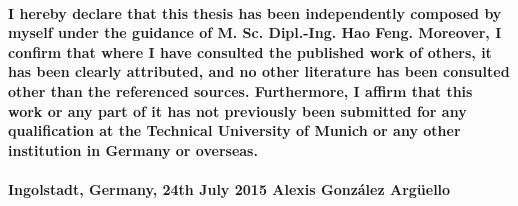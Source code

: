 \bigskip\bigskip\bigskip
\linespread{1.5}
\paragraph{I hereby declare that this thesis has been independently composed by myself under the guidance of M. Sc. Dipl.-Ing. Hao Feng. Moreover, I confirm that where I have consulted the published work of others, it has been clearly attributed, and no other literature has been consulted other than the referenced sources. Furthermore, I affirm that this work or any part of it has not previously been submitted for any qualification at the Technical University of Munich or any other institution in Germany or overseas. }
\bigskip\bigskip\bigskip
\paragraph{ \hspace{1.5cm} Ingolstadt, Germany, 24th July 2015 \hspace{1.5cm}Alexis Gonz\'{a}lez Arg\"{u}ello}

\linespread{1.0}